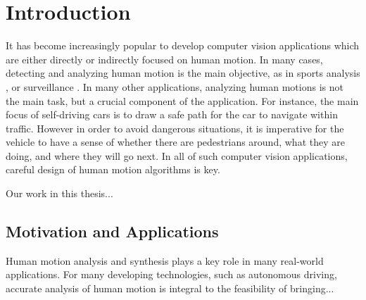 \chapter{Introduction}
It has become increasingly popular to develop computer vision applications which are either directly or indirectly focused on human motion. In many cases, detecting and analyzing human motion is the main objective, as in sports analysis \cite{Takahashi1996Structure, Xia2002Analysis}, or surveillance \cite{Jiang1989}. In many other applications, analyzing human motions is not the main task, but a crucial component of the application. For instance, the main focus of self-driving cars is to draw a safe path for the car to navigate within traffic. However in order to avoid dangerous situations, it is imperative for the vehicle to have a sense of whether there are pedestrians around, what they are doing, and where they will go next. In all of such computer vision applications, careful design of human motion algorithms is key. 

Our work in this thesis...



\section{Motivation and Applications}
Human motion analysis and synthesis plays a key role in many real-world applications. For many developing technologies, such as autonomous driving, accurate analysis of human motion is integral to the feasibility of bringing... \cite{Takahashi1996Structure,Jiang1989}
